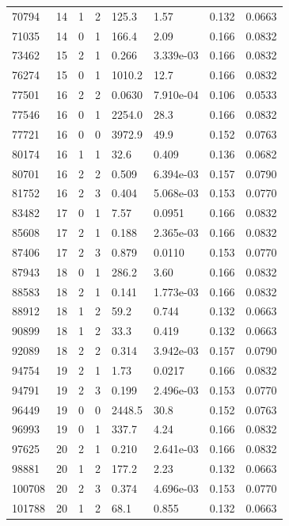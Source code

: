 \documentclass[preview]{standalone}
\begin{document}
{{{\begin{tabular}{L{1.2cm}C{1.2cm} C{0.3cm}C{0.5cm} C{1.4cm}C{1.4cm} C{1.4cm}C{1.4cm}}
  70794  &    14  & 1     &  2 &  125.3  & 1.57  & 0.132 &  0.0663   \\ 
  71035  &    14  & 0     &  1 &  166.4  & 2.09  & 0.166 &  0.0832   \\ 
  73462  &    15  & 2     &  1 &  0.266  & 3.339e-03  & 0.166 &  0.0832   \\ 
  76274  &    15  & 0     &  1 &  1010.2  & 12.7  & 0.166 &  0.0832   \\ 
  77501  &    16  & 2     &  2 &  0.0630  & 7.910e-04  & 0.106 &  0.0533   \\ 
  77546  &    16  & 0     &  1 &  2254.0  & 28.3  & 0.166 &  0.0832   \\ 
  77721  &    16  & 0     &  0 &  3972.9  & 49.9  & 0.152 &  0.0763   \\ 
  80174  &    16  & 1     &  1 &  32.6  & 0.409  & 0.136 &  0.0682   \\ 
  80701  &    16  & 2     &  2 &  0.509  & 6.394e-03  & 0.157 &  0.0790   \\ 
  81752  &    16  & 2     &  3 &  0.404  & 5.068e-03  & 0.153 &  0.0770   \\ 
  83482  &    17  & 0     &  1 &  7.57  & 0.0951  & 0.166 &  0.0832   \\ 
  85608  &    17  & 2     &  1 &  0.188  & 2.365e-03  & 0.166 &  0.0832   \\ 
  87406  &    17  & 2     &  3 &  0.879  & 0.0110  & 0.153 &  0.0770   \\ 
  87943  &    18  & 0     &  1 &  286.2  & 3.60  & 0.166 &  0.0832   \\ 
  88583  &    18  & 2     &  1 &  0.141  & 1.773e-03  & 0.166 &  0.0832   \\ 
  88912  &    18  & 1     &  2 &  59.2  & 0.744  & 0.132 &  0.0663   \\ 
  90899  &    18  & 1     &  2 &  33.3  & 0.419  & 0.132 &  0.0663   \\ 
  92089  &    18  & 2     &  2 &  0.314  & 3.942e-03  & 0.157 &  0.0790   \\ 
  94754  &    19  & 2     &  1 &  1.73  & 0.0217  & 0.166 &  0.0832   \\ 
  94791  &    19  & 2     &  3 &  0.199  & 2.496e-03  & 0.153 &  0.0770   \\ 
  96449  &    19  & 0     &  0 &  2448.5  & 30.8  & 0.152 &  0.0763   \\ 
  96993  &    19  & 0     &  1 &  337.7  & 4.24  & 0.166 &  0.0832   \\ 
  97625  &    20  & 2     &  1 &  0.210  & 2.641e-03  & 0.166 &  0.0832   \\ 
  98881  &    20  & 1     &  2 &  177.2  & 2.23  & 0.132 &  0.0663   \\ 
  100708  &    20  & 2     &  3 &  0.374  & 4.696e-03  & 0.153 &  0.0770   \\ 
  101788  &    20  & 1     &  2 &  68.1  & 0.855  & 0.132 &  0.0663   \\ 
\hline 
\end{tabular} 

}}}
\end{document}
